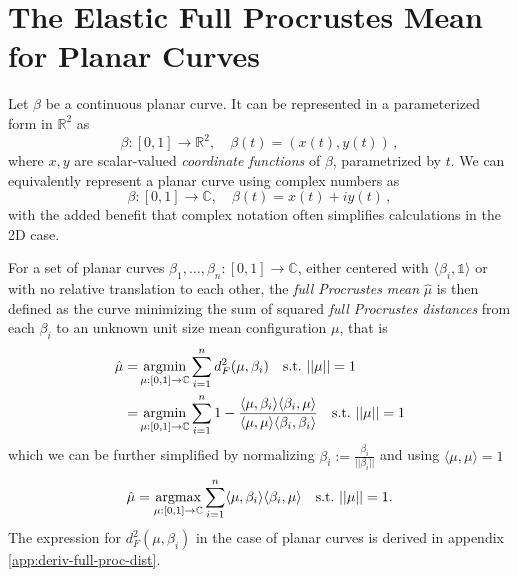 \section{The Elastic Full Procrustes Mean for Planar Curves}

Let $\beta$ be a continuous planar curve.
It can be represented in a parameterized form in $\mathbb{R}^2$ as
$$ \beta : [0,1] \rightarrow \mathbb{R}^2,\quad \beta(t) = ( x(t), y(t)) \,, $$
where $x, y$ are scalar-valued \textit{coordinate functions} of $\beta$, parametrized by $t$.
We can equivalently represent a planar curve using complex numbers as
$$ \beta : [0,1] \rightarrow \mathbb{C},\quad \beta(t) = x(t) + iy(t) \,, $$
with the added benefit that complex notation often simplifies calculations in the 2D case.

For a set of planar curves $\beta_1,\dots,\beta_n : [0,1] \rightarrow \mathbb{C}$, either centered with $\langle \beta_i, \mathbb{1} \rangle$ or with no relative translation to each other, the \textit{full Procrustes mean} $\hat{\mu}$ is then defined as the curve minimizing the sum of squared \textit{full Procrustes distances} from each $\beta_i$ to an unknown unit size mean configuration $\mu$, that is
\begin{align*}
    \hat{\mu} =& \operatorname*{argmin}_{\mu:[0,1]\rightarrow\mathbb{C}} \sum_{i=1}^n d^2_F(\mu,\beta_i)
    \quad\text{s.t.}\,\, ||\mu|| = 1 \\
    =& \operatorname*{argmin}_{\mu:[0,1]\rightarrow\mathbb{C}} \sum_{i=1}^n 1 - \frac{\langle \mu, \beta_i \rangle \langle \beta_i, \mu \rangle}{\langle \mu, \mu \rangle \langle \beta_i, \beta_i \rangle}
    \quad\text{s.t.}\,\, ||\mu|| = 1
\end{align*}
which we can be further simplified by normalizing $\beta_i := \frac{\beta_i}{|| \beta_i ||}$ and using $\langle \mu, \mu \rangle = 1$
$$ \hat{\mu} = \operatorname*{argmax}_{\mu:[0,1]\rightarrow\mathbb{C}} \sum_{i=1}^n \langle \mu, \beta_i \rangle \langle \beta_i, \mu \rangle \quad\text{s.t.}\,\, ||\mu|| = 1. $$
The expression for $d^2_F(\mu,\beta_i)$ in the case of planar curves is derived in appendix \ref{app:deriv-full-proc-dist}.




